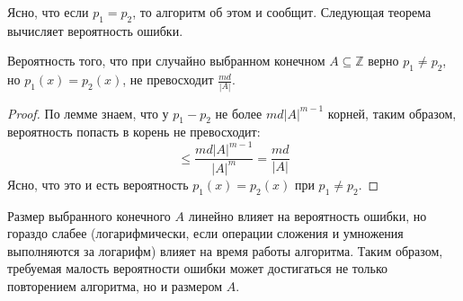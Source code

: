 Ясно, что если $p_1=p_2$, то алгоритм об этом и сообщит. Следующая теорема вычисляет вероятность ошибки.
\begin{theorem*}
Вероятность того, что при случайно выбранном конечном $A\subseteq \mathbb Z$ верно $p_1 \neq p_2$, но $p_1(x) = p_2(x)$, не превосходит $\frac{md}{|A|}$.
\end{theorem*}
\begin{proof}
    По лемме знаем, что у $p_1-p_2$ не более $md|A|^{m-1}$ корней, таким образом, вероятность попасть в корень не превосходит: $$\leq \frac{md|A|^{m-1}}{|A|^m} = \frac{md}{|A|}$$ Ясно, что это и есть вероятность $p_1(x)=p_2(x)$ при $p_1 \neq p_2$.
\end{proof}

\begin{nb*} Размер выбранного конечного $A$ линейно влияет на вероятность ошибки, но гораздо слабее (логарифмически, если операции сложения и умножения выполняются за логарифм) влияет на время работы алгоритма. Таким образом, требуемая малость вероятности ошибки может достигаться не только повторением алгоритма, но и размером $A$.
\end{nb*}